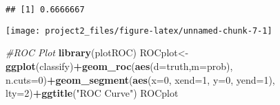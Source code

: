 \documentclass[]{article}
\newenvironment{Shaded}{\begin{snugshade}}{\end{snugshade}}
\newcommand{\CommentTok}[1]{\textcolor[rgb]{0.56,0.35,0.01}{\textit{#1}}}
\newcommand{\DataTypeTok}[1]{\textcolor[rgb]{0.13,0.29,0.53}{#1}}
\newcommand{\DecValTok}[1]{\textcolor[rgb]{0.00,0.00,0.81}{#1}}
\newcommand{\KeywordTok}[1]{\textcolor[rgb]{0.13,0.29,0.53}{\textbf{#1}}}
\newcommand{\NormalTok}[1]{#1}
\newcommand{\OperatorTok}[1]{\textcolor[rgb]{0.81,0.36,0.00}{\textbf{#1}}}
\newcommand{\StringTok}[1]{\textcolor[rgb]{0.31,0.60,0.02}{#1}}
\begin{document}
\begin{verbatim}
## [1] 0.6666667
\end{verbatim}

\begin{Shaded}
\end{Shaded}

\begin{center}\texttt{[image: project2\_files/figure-latex/unnamed-chunk-7-1]} \end{center}

\begin{Shaded}
\begin{Highlighting}[]
\CommentTok{#ROC Plot}
\KeywordTok{library}\NormalTok{(plotROC)}
\NormalTok{ROCplot<-}\KeywordTok{ggplot}\NormalTok{(classify)}\OperatorTok{+}\KeywordTok{geom_roc}\NormalTok{(}\KeywordTok{aes}\NormalTok{(}\DataTypeTok{d=}\NormalTok{truth,}\DataTypeTok{m=}\NormalTok{prob), }\DataTypeTok{n.cuts=}\DecValTok{0}\NormalTok{)}\OperatorTok{+}\KeywordTok{geom_segment}\NormalTok{(}\KeywordTok{aes}\NormalTok{(}\DataTypeTok{x=}\DecValTok{0}\NormalTok{,}
  \DataTypeTok{xend=}\DecValTok{1}\NormalTok{, }\DataTypeTok{y=}\DecValTok{0}\NormalTok{, }\DataTypeTok{yend=}\DecValTok{1}\NormalTok{), }\DataTypeTok{lty=}\DecValTok{2}\NormalTok{)}\OperatorTok{+}\KeywordTok{ggtitle}\NormalTok{(}\StringTok{"ROC Curve"}\NormalTok{)}
\NormalTok{ROCplot}
\end{Highlighting}
\end{Shaded}
\end{document}

